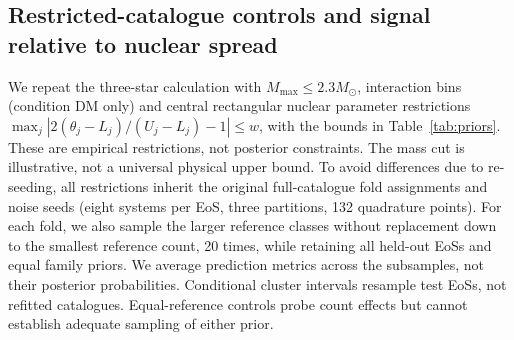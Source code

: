 \documentclass[11pt,a4paper]{article}
\newcommand{\Msun}{M_\odot}
\begin{document}
\subsection{Restricted-catalogue controls and signal relative to nuclear spread}\label{sec:sensitivity}
We repeat the three-star calculation with $M_{\max}\leq2.3\Msun$, interaction bins (condition DM only) and central rectangular nuclear parameter restrictions $\max_j|2(\theta_j-L_j)/(U_j-L_j)-1|\le w$, with the bounds in Table~\ref{tab:priors}. These are empirical restrictions, not posterior constraints. The mass cut is illustrative, not a universal physical upper bound. To avoid differences due to re-seeding, all restrictions inherit the original full-catalogue fold assignments and noise seeds (eight systems per EoS, three partitions, 132 quadrature points). For each fold, we also sample the larger reference classes without replacement down to the smallest reference count, 20 times, while retaining all held-out EoSs and equal family priors. We average prediction metrics across the subsamples, not their posterior probabilities. Conditional cluster intervals resample test EoSs, not refitted catalogues. Equal-reference controls probe count effects but cannot establish adequate sampling of either prior.
\end{document}
